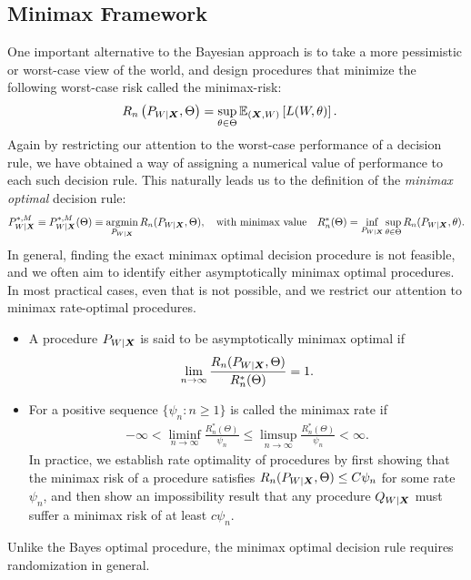 \documentclass[12pt]{article}
\begin{document}
\subsection{Minimax Framework}
One important alternative to the Bayesian approach is to take a more pessimistic or worst-case view of the world, and design procedures that minimize the following worst-case risk called the minimax-risk: 
\begin{align}
	R_n\left( P_{W|{\boldsymbol X}}, \Theta \right) & = \sup_{\theta \in \Theta} \mathbb{E}_{({\boldsymbol X}, W)}\left[ L(W, \theta) \right]. 
\end{align}
Again by restricting our attention to the worst-case performance of a decision rule, we have obtained a way of assigning a numerical value of performance to each such decision rule. This naturally leads us to the definition of the \emph{minimax optimal} decision rule: 
\begin{align}
	P^{*, M}_{W|{\boldsymbol X}} \equiv P^{*, M}_{W|{\boldsymbol X}}(\Theta) \equiv \operatorname*{argmin}_{P_{W|{\boldsymbol X}}} R_n(P_{W|{\boldsymbol X}}, \Theta), \quad \text{with minimax value} \quad R^*_n(\Theta) = \inf_{P_{W|{\boldsymbol X}}} \sup_{\theta \in \Theta} R_n(P_{W|{\boldsymbol X}}, \theta). 
\end{align}
In general, finding the exact minimax optimal decision procedure is not feasible, and we often aim to identify either asymptotically minimax optimal procedures. In most practical cases, even that is not possible, and we restrict our attention to minimax rate-optimal procedures. 
\begin{itemize}
\item A procedure $P_{W|{\boldsymbol X}}$ is said to be asymptotically minimax optimal if 
\begin{align}
	\lim_{n \to \infty} \frac{R_n(P_{W|{\boldsymbol X}}, \Theta)}{R_n^*(\Theta)} = 1. 
\end{align}
\item For a positive sequence $\{\psi_n: n \geq 1\}$ is called the minimax rate if 
\begin{align}
-\infty < \liminf_{n \to \infty} \frac{R_n^*(\Theta)}{\psi_n} \leq \limsup_{n \to \infty} \frac{R_n^*(\Theta)}{\psi_n} < \infty. 
\end{align}
In practice, we establish rate optimality of procedures by first showing that the minimax risk of a procedure satisfies $R_n(P_{W|{\boldsymbol X}}, \Theta) \leq C \psi_n$ for some rate $\psi_n$, and then show an impossibility result that any procedure $Q_{W|{\boldsymbol X}}$ must suffer a minimax risk of at least $c \psi_n$.  
\end{itemize}


Unlike the Bayes optimal procedure, the minimax optimal decision rule  requires randomization in general. 
\end{document}
